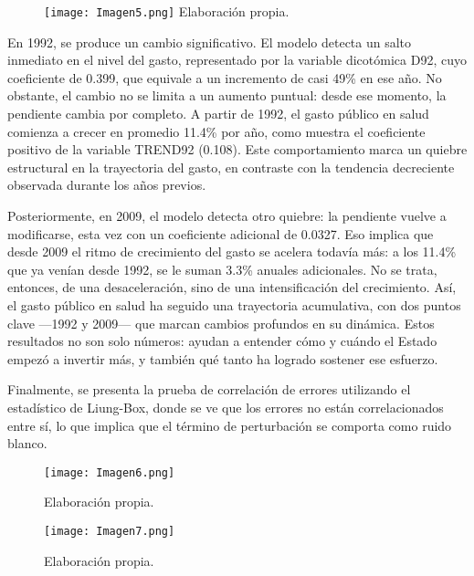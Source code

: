 \documentclass[12pt]{article}
\begin{document}
\begin{figure}[H]
\par\vspace{0.8em}
\texttt{[image: Imagen5.png]}
{\footnotesize Elaboración propia.}
\end{figure}

En 1992, se produce un cambio significativo. El modelo detecta un salto inmediato en el nivel del gasto, representado por la variable dicotómica D92, cuyo coeficiente de 0.399, que equivale a un incremento de casi 49\% en ese año. No obstante, el cambio no se limita a un aumento puntual: desde ese momento, la pendiente cambia por completo. A partir de 1992, el gasto público en salud comienza a crecer en promedio 11.4\% por año, como muestra el coeficiente positivo de la variable TREND92 (0.108). Este comportamiento marca un quiebre estructural en la trayectoria del gasto, en contraste con la tendencia decreciente observada durante los años previos.

Posteriormente, en 2009, el modelo detecta otro quiebre: la pendiente vuelve a modificarse, esta vez con un coeficiente adicional de 0.0327. Eso implica que desde 2009 el ritmo de crecimiento del gasto se acelera todavía más: a los 11.4\% que ya venían desde 1992, se le suman 3.3\% anuales adicionales. No se trata, entonces, de una desaceleración, sino de una intensificación del crecimiento. Así, el gasto público en salud ha seguido una trayectoria acumulativa, con dos puntos clave —1992 y 2009— que marcan cambios profundos en su dinámica. Estos resultados no son solo números: ayudan a entender cómo y cuándo el Estado empezó a invertir más, y también qué tanto ha logrado sostener ese esfuerzo.

Finalmente, se presenta la prueba de correlación de errores utilizando el estadístico de Liung-Box, donde se ve que los errores no están correlacionados entre sí, lo que implica que el término de perturbación se comporta como ruido blanco.

\begin{figure}[H]
\par\vspace{0.8em}
\texttt{[image: Imagen6.png]}

{\footnotesize Elaboración propia.}
\end{figure}

\begin{figure}[H]
\par\vspace{0.8em}
\texttt{[image: Imagen7.png]}

{\footnotesize Elaboración propia.}
\end{figure}
\end{document}
